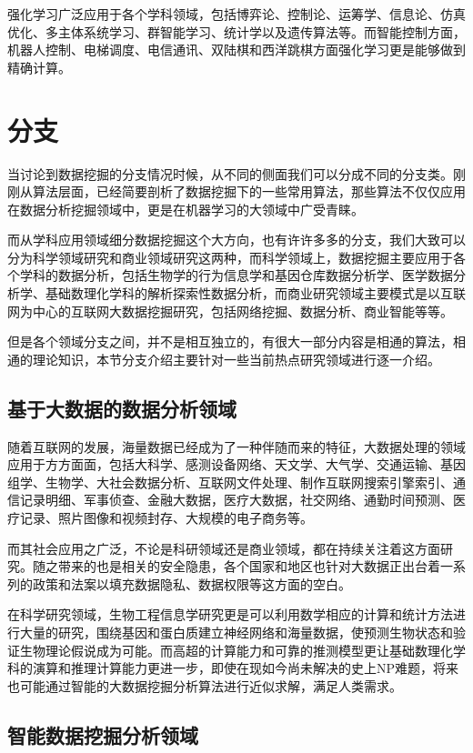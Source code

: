 \documentclass{misc/elegantpaper}
\begin{document}
强化学习广泛应用于各个学科领域，包括博弈论、控制论、运筹学、信息论、仿真优化、多主体系统学习、群智能学习、统计学以及遗传算法等。而智能控制方面，机器人控制、电梯调度、电信通讯、双陆棋和西洋跳棋方面强化学习更是能够做到精确计算。


\section{分支}

当讨论到数据挖掘的分支情况时候，从不同的侧面我们可以分成不同的分支类。刚刚从算法层面，已经简要剖析了数据挖掘下的一些常用算法，那些算法不仅仅应用在数据分析挖掘领域中，更是在机器学习的大领域中广受青睐。

而从学科应用领域细分数据挖掘这个大方向，也有许许多多的分支，我们大致可以分为科学领域研究和商业领域研究这两种，而科学领域上，数据挖掘主要应用于各个学科的数据分析，包括生物学的行为信息学和基因仓库数据分析学、医学数据分析学、基础数理化学科的解析探索性数据分析，而商业研究领域主要模式是以互联网为中心的互联网大数据挖掘研究，包括网络挖掘、数据分析、商业智能等等。

但是各个领域分支之间，并不是相互独立的，有很大一部分内容是相通的算法，相通的理论知识，本节分支介绍主要针对一些当前热点研究领域进行逐一介绍。

\subsection{基于大数据的数据分析领域}

随着互联网的发展，海量数据已经成为了一种伴随而来的特征，大数据处理的领域应用于方方面面，包括大科学、感测设备网络、天文学、大气学、交通运输、基因组学、生物学、大社会数据分析、互联网文件处理、制作互联网搜索引擎索引、通信记录明细、军事侦查、金融大数据，医疗大数据，社交网络、通勤时间预测、医疗记录、照片图像和视频封存、大规模的电子商务等。

而其社会应用之广泛，不论是科研领域还是商业领域，都在持续关注着这方面研究。随之带来的也是相关的安全隐患，各个国家和地区也针对大数据正出台着一系列的政策和法案以填充数据隐私、数据权限等这方面的空白。

在科学研究领域，生物工程信息学研究更是可以利用数学相应的计算和统计方法进行大量的研究，围绕基因和蛋白质建立神经网络和海量数据，使预测生物状态和验证生物理论假说成为可能。而高超的计算能力和可靠的推测模型更让基础数理化学科的演算和推理计算能力更进一步，即使在现如今尚未解决的史上NP难题，将来也可能通过智能的大数据挖掘分析算法进行近似求解，满足人类需求。

\subsection{智能数据挖掘分析领域}
\end{document}

